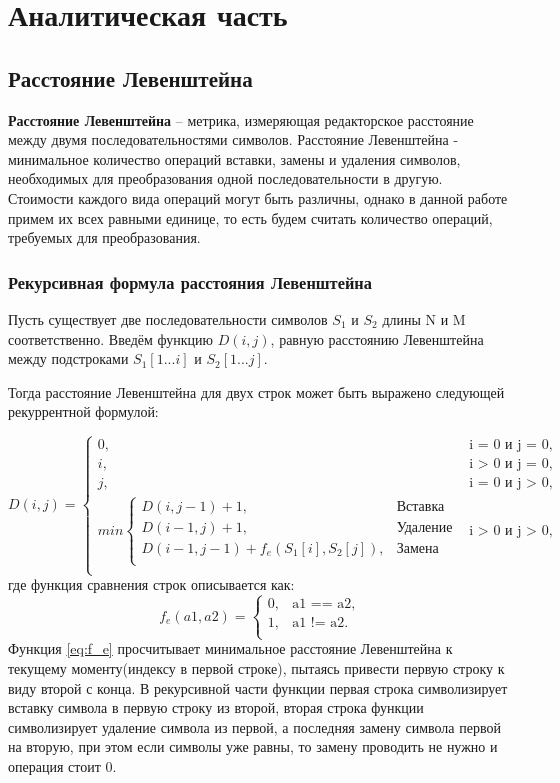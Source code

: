 \chapter{Аналитическая часть}
\section{Расстояние Левенштейна}
\textbf{Расстояние Левенштейна} – метрика, измеряющая редакторское расстояние между двумя последовательностями символов. Расстояние Левенштейна - минимальное количество операций вставки, замены и удаления символов, необходимых для преобразования одной последовательности в другую. Стоимости каждого вида операций могут быть различны, однако в данной работе примем их всех равными единице, то есть будем считать количество операций, требуемых для преобразования.

\subsection{Рекурсивная формула расстояния Левенштейна}

Пусть существует две последовательности символов $S_1$ и $S_2$ длины N и M соответственно. Введём функцию $D(i, j)$, равную расстоянию Левенштейна между подстроками $S_1[1...i]$ и $S_2[1...j]$.

Тогда расстояние Левенштейна для двух строк может быть выражено следующей рекуррентной формулой:

\begin{equation}
	\label{eq:D}
	D(i, j) = 
	\begin{cases}
		0, &\text{i = 0 и j = 0},\\
		i, &\text{i > 0 и j = 0},\\
		j, &\text{i = 0 и j > 0},\\
		min \begin{cases}
			D(i, j - 1) + 1, &\text{Вставка}\\
			D(i - 1, j) + 1, &\text{Удаление}\\
			D(i - 1, j - 1) + f_e(S_1[i], S_2[j]), &\text{Замена}\\
		\end{cases} &\text{i > 0 и j > 0},\\
	\end{cases}
\end{equation}
где функция сравнения строк описывается как:
\begin{equation}
	\label{eq:f_e}
	f_e(a1, a2) = 
	\begin{cases}
		0, &\text{a1 == a2},\\
		1, &\text{a1 != a2}.\\
	\end{cases}
\end{equation}
Функция \ref{eq:f_e} просчитывает минимальное расстояние Левенштейна к текущему моменту(индексу в первой строке), пытаясь привести первую строку к виду второй с конца. В рекурсивной части функции первая строка символизирует вставку символа в первую строку из второй, вторая строка функции символизирует удаление символа из первой, а последняя замену символа первой на вторую, при этом если символы уже равны, то замену проводить не нужно и операция стоит 0.

